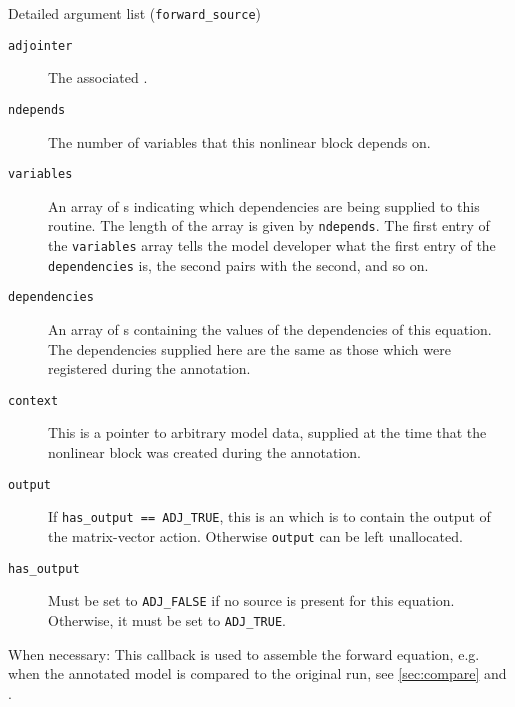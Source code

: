 \begin{boxwithtitle}{Detailed argument list (\texttt{forward_source})}
\begin{description}
\item[\texttt{adjointer}] The associated .
\item[\texttt{ndepends}] The number of variables that this nonlinear block depends on.
\item[\texttt{variables}] An array of s indicating which dependencies are being supplied to this routine. The length of the
array is given by \texttt{ndepends}. The first entry of the \texttt{variables} array
tells the model developer what the first entry of the \texttt{dependencies} is, the second pairs with the second, and so on.
\item[\texttt{dependencies}] An array of s containing the values of the dependencies of this equation. The dependencies supplied
here are the same as those which were registered during the annotation.
\item[\texttt{context}] This is a pointer to arbitrary model data, supplied at the time that the nonlinear block was created during the annotation.
\item[\texttt{output}] If \texttt{has_output == ADJ_TRUE}, this is an  which is to contain the output of the matrix-vector action. Otherwise \texttt{output} can be left unallocated.
\item[\texttt{has_output}] Must be set to \texttt{ADJ_FALSE} if no source is present for this equation. Otherwise, it must be set to \texttt{ADJ_TRUE}.
\end{description}
\end{boxwithtitle}

When necessary: 
This callback is used to assemble the forward equation, e.g. when the annotated model is compared to the original run, see \autoref{sec:compare} and .


